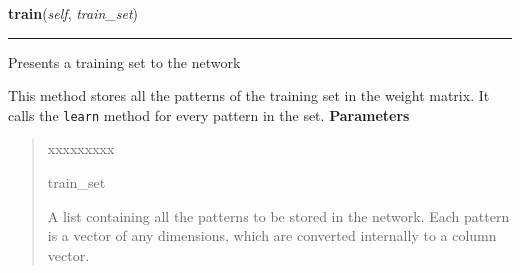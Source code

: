 \hspace{.8\funcindent}\begin{boxedminipage}{\funcwidth}

    \raggedright \textbf{train}(\textit{self}, \textit{train\_set})

    \vspace{-1.5ex}

    \rule{\textwidth}{0.5\fboxrule}
\setlength{\parskip}{2ex}

Presents a training set to the network

This method stores all the patterns of the training set in the weight
matrix. It calls the \texttt{learn} method for every pattern in the set.
\setlength{\parskip}{1ex}
      \textbf{Parameters}
      \vspace{-1ex}

      \begin{quote}
        \begin{Ventry}{xxxxxxxxx}

          \item[train\_set]


A list containing all the patterns to be stored in the network. Each
pattern is a vector of any dimensions, which are converted
internally to a column vector.
        \end{Ventry}

      \end{quote}

    \end{boxedminipage}

    \label{peach:nn:mem:Hopfield:step}

    \vspace{0.5ex}

